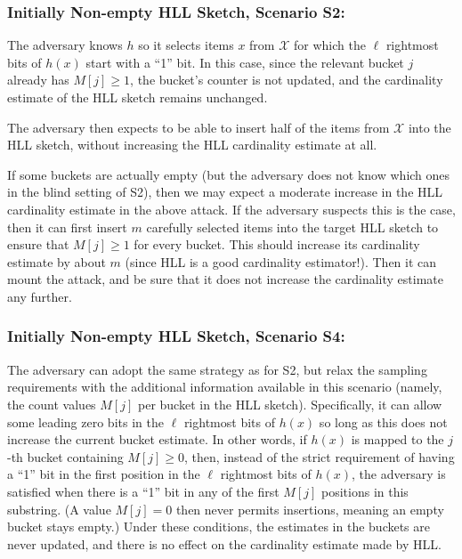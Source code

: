 \documentclass[sigconf, anonymous, dvipsnames]{acmart} %
\begin{document}
\subsubsection{Initially Non-empty HLL Sketch, Scenario S2:}\label{sec:nonemptyHLLS2}
The adversary knows $h$ so it selects items $x$ from ${\mathcal{X}}$ for which the $\ell$ rightmost bits of $h(x)$ start with a ``1'' bit. In this case, since the relevant bucket $j$ already has $M[j] \ge 1$, the bucket's counter is not updated, and the cardinality estimate of the HLL sketch remains unchanged. 

The adversary then expects to be able to insert half of the items from ${\mathcal{X}}$ into the HLL sketch, without increasing the HLL cardinality estimate at all.

If some buckets are actually empty (but the adversary does not know which ones in the blind setting of S2), then we may expect a moderate increase in the HLL cardinality estimate in the above attack. If the adversary suspects this is the case, then it can first insert $m$ carefully selected items into the target HLL sketch to ensure that $M[j] \ge 1$ for every bucket. This should increase its cardinality estimate by about $m$ (since HLL is a good cardinality estimator!). Then it can mount the attack, and be sure that it does not increase the cardinality estimate any further.

\subsubsection{Initially Non-empty HLL Sketch, Scenario S4:}\label{sec:nonemptyHLLS4}
The adversary can adopt the same strategy as for S2, but relax the sampling requirements with the additional information available in this scenario (namely, the count values $M[j]$ per bucket in the HLL sketch). Specifically, it can allow some leading zero bits in the $\ell$ rightmost bits of $h(x)$ so long as this does not increase the current bucket estimate. In other words, if $h(x)$ is mapped to the $j$-th bucket containing $M[j] \ge 0$, then, instead of the strict requirement of having a ``1'' bit in the first position in the $\ell$ rightmost bits of $h(x)$, the adversary is satisfied when there is a ``1'' bit in any of the first $M[j]$ positions in this substring. (A value $M[j]=0$ then never permits insertions, meaning an empty bucket stays empty.) Under these conditions, the estimates in the buckets are never updated, and there is no effect on the cardinality estimate made by HLL.
\end{document}
